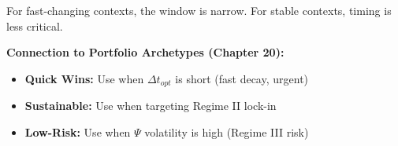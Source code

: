 \begin{tcolorbox}[colback=red!5!white, colframe=red!75!black,
    title=\textbf{Theorem NTM-T8: Optimal Intervention Timing Rule}]
For fast-changing contexts, the window is narrow. For stable contexts, timing is less critical.

\textbf{Connection to Portfolio Archetypes (Chapter 20):}
\begin{itemize}[nosep]
\item \textbf{Quick Wins:} Use when $\Delta t_{opt}$ is short (fast decay, urgent)
\item \textbf{Sustainable:} Use when targeting Regime II lock-in
\item \textbf{Low-Risk:} Use when $\Psi$ volatility is high (Regime III risk)
\end{itemize}

\end{tcolorbox}

\begin{tcolorbox}[colback=gray!5!white, colframe=gray!75!black,
    title=\textbf{UNTCM Parameter Summary Table}]


\end{tcolorbox}

